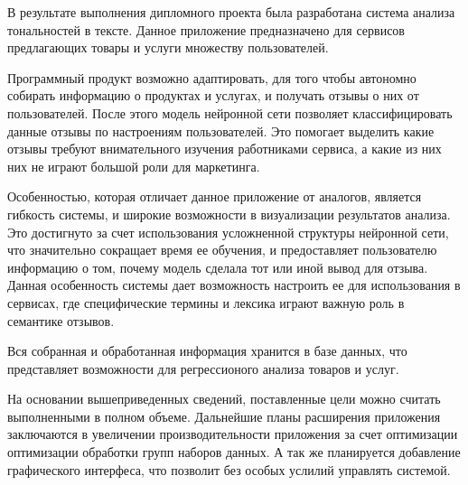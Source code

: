 \label{sec:outro}
В результате выполнения дипломного проекта была разработана система анализа тональностей в тексте. Данное приложение предназначено для сервисов предлагающих товары и услуги множеству пользователей.

Программный продукт возможно адаптировать, для того чтобы автономно собирать информацию о продуктах и услугах, и получать отзывы о них от пользователей. После этого модель нейронной сети позволяет классифицировать данные отзывы по настроениям пользователей. Это помогает выделить какие отзывы требуют внимательного изучения работниками сервиса, а какие из них них не играют большой роли для маркетинга.

Особенностью, которая отличает данное приложение от аналогов, является гибкость системы, и широкие возможности в визуализации результатов анализа. Это достигнуто за счет использования усложненной структуры нейронной сети, что значительно сокращает время ее обучения, и предоставляет пользователю информацию о том, почему модель сделала тот или иной вывод для отзыва. Данная особенность системы дает возможность настроить ее для использования в сервисах, где специфические термины и лексика играют важную роль в семантике отзывов.

Вся собранная и обработанная информация хранится в базе данных, что представляет возможности для регрессионого анализа товаров и услуг.

На основании вышеприведенных сведений, поставленные цели можно считать выполненными в полном объеме. Дальнейшие планы расширения приложения заключаются в увеличении производительности приложения за счет оптимизации оптимизации обработки групп наборов данных. А так же планируется добавление графического интерфеса, что позволит без особых услилий управлять системой.